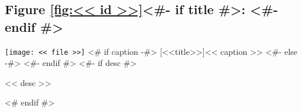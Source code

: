 \subsection{Figure \ref{fig:<< id >>}<#- if title #>: <#- endif #>\hfill%
  \color{light-gray}}
\noindent\texttt{[image: << file >>]}
<# if caption -#>
[<<title>>]{<< caption >>}
<#- else -#>
<#- endif #>\label{fig:<< id >>}
<#- if desc #>
\nopagebreak
\begin{figinfo}<< desc >>\end{figinfo}
<# endif #>
\vspace{20pt}
